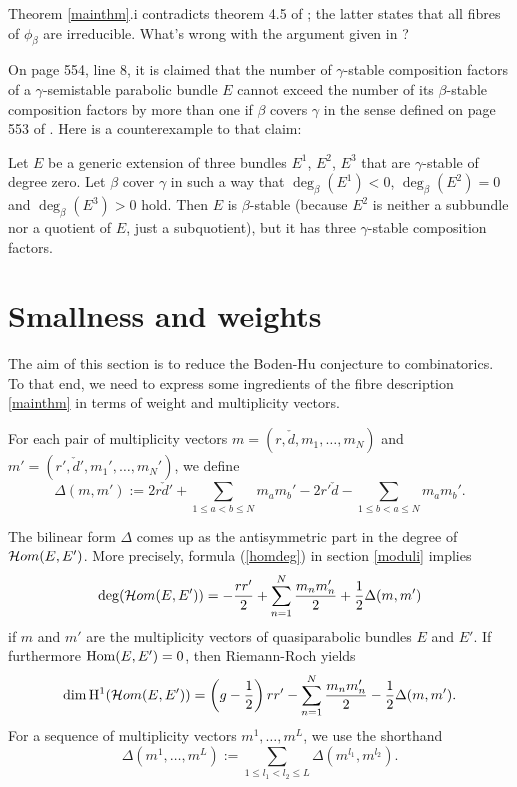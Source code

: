 \documentclass{article}
\begin{document}
\begin{rem}
  Theorem \ref{mainthm}.i contradicts theorem 4.5 of \cite{boden}; the latter states that all fibres of $\phi_{\beta}$ are irreducible. What's
  wrong with the argument given in \cite{boden}?

  On page 554, line 8, it is claimed that the number of $\gamma$-stable composition factors of a $\gamma$-semistable parabolic bundle $E$ cannot exceed
  the number of its $\beta$-stable composition factors by more than one if $\beta$ covers $\gamma$ in the sense defined on page 553 of \cite{boden}. Here
  is a counterexample to that claim:

  Let $E$ be a generic extension of three bundles $E^1$, $E^2$, $E^3$ that are $\gamma$-stable of degree zero. Let $\beta$ cover $\gamma$ in such a way
  that $\deg_{\beta}( E^1) < 0$, $\deg_{\beta}( E^2) = 0$ and $\deg_{\beta}( E^3) > 0$ hold. Then $E$ is $\beta$-stable (because $E^2$ is neither a
  subbundle nor a quotient of $E$, just a subquotient), but it has three $\gamma$-stable composition factors.
\end{rem}


\section{Smallness and weights} \label{translation}

The aim of this section is to reduce the Boden-Hu conjecture to combinatorics. To that end, we need to express some ingredients of the fibre description
\ref{mainthm} in terms of weight and multiplicity vectors.

\begin{defn} \label{delta}
  For each pair of multiplicity vectors $m = (r, \check{d}, m_1, \ldots, m_N)$ and $m' = (r', \check{d}', m_1', \ldots, m_N')$, we define
  \begin{displaymath}
    \Delta(m, m') := 2 r \check{d}' + \sum_{1 \leq a < b \leq N} m_a m_b' - 2 r' \check{d} - \sum_{1 \leq b < a \leq N} m_a m_b'.
  \end{displaymath}
\end{defn}

The bilinear form $\Delta$ comes up as the antisymmetric part in the degree of $\mathcal{H}om(E, E')$. More precisely, formula (\ref{homdeg}) in section
\ref{moduli} implies
\begin{displaymath}
  \deg( \mathcal{H}om( E, E')) = -\frac{r r'}{2} + \sum_{n=1}^N \frac{m_n m_n'}{2} + \frac{1}{2}\Delta(m, m')
\end{displaymath}
if $m$ and $m'$ are the multiplicity vectors of quasiparabolic bundles $E$ and $E'$. If furthermore $\mathrm{Hom}(E, E') = 0$, then Riemann-Roch yields
\begin{displaymath}
  \dim \mathrm{H}^1( \mathcal{H}om( E, E')) = \left( g - \frac{1}{2} \right) r r' - \sum_{n=1}^N \frac{m_n m_n'}{2} - \frac{1}{2}\Delta(m, m').
\end{displaymath}
For a sequence of multiplicity vectors $m^1, \ldots, m^L$, we use the shorthand
\begin{displaymath}
  \Delta(m^1, \ldots, m^L) := \sum_{1 \leq l_1 < l_2 \leq L} \Delta( m^{l_1}, m^{l_2}).
\end{displaymath}
\end{document}
